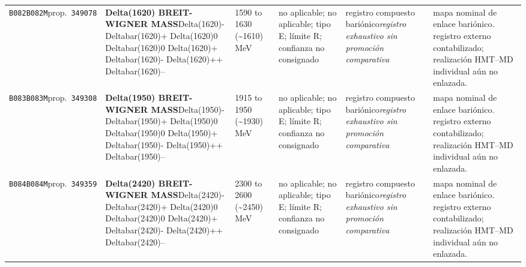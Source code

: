 \begin{landscape}
\begin{longtable}{L{1.85cm}L{4.45cm}L{2.35cm}L{4.05cm}L{3.35cm}L{7.15cm}}
\texttt{B082}\newline \texttt{B082M}\newline prop.\ \texttt{349078} & \textbf{Delta(1620) BREIT-WIGNER MASS}\newline Delta(1620)- \textbar{}\allowbreak{} Deltabar(1620)+ \textbar{}\allowbreak{} Delta(1620)0 \textbar{}\allowbreak{} Deltabar(1620)0 \textbar{}\allowbreak{} Delta(1620)+ \textbar{}\allowbreak{} Deltabar(1620)- \textbar{}\allowbreak{} Delta(1620)++ \textbar{}\allowbreak{} Deltabar(1620)-- & 1590 to 1630 (\textasciitilde{}1610)\,MeV & no aplicable; no aplicable; tipo E; límite R; confianza no consignado & registro compuesto bariónico\newline \emph{registro exhaustivo sin promoción comparativa} & mapa nominal de enlace bariónico. registro externo contabilizado; realización HMT--MD individual aún no enlazada. \\
\texttt{B083}\newline \texttt{B083M}\newline prop.\ \texttt{349308} & \textbf{Delta(1950) BREIT-WIGNER MASS}\newline Delta(1950)- \textbar{}\allowbreak{} Deltabar(1950)+ \textbar{}\allowbreak{} Delta(1950)0 \textbar{}\allowbreak{} Deltabar(1950)0 \textbar{}\allowbreak{} Delta(1950)+ \textbar{}\allowbreak{} Deltabar(1950)- \textbar{}\allowbreak{} Delta(1950)++ \textbar{}\allowbreak{} Deltabar(1950)-- & 1915 to 1950 (\textasciitilde{}1930)\,MeV & no aplicable; no aplicable; tipo E; límite R; confianza no consignado & registro compuesto bariónico\newline \emph{registro exhaustivo sin promoción comparativa} & mapa nominal de enlace bariónico. registro externo contabilizado; realización HMT--MD individual aún no enlazada. \\
\texttt{B084}\newline \texttt{B084M}\newline prop.\ \texttt{349359} & \textbf{Delta(2420) BREIT-WIGNER MASS}\newline Delta(2420)- \textbar{}\allowbreak{} Deltabar(2420)+ \textbar{}\allowbreak{} Delta(2420)0 \textbar{}\allowbreak{} Deltabar(2420)0 \textbar{}\allowbreak{} Delta(2420)+ \textbar{}\allowbreak{} Deltabar(2420)- \textbar{}\allowbreak{} Delta(2420)++ \textbar{}\allowbreak{} Deltabar(2420)-- & 2300 to 2600 (\textasciitilde{}2450)\,MeV & no aplicable; no aplicable; tipo E; límite R; confianza no consignado & registro compuesto bariónico\newline \emph{registro exhaustivo sin promoción comparativa} & mapa nominal de enlace bariónico. registro externo contabilizado; realización HMT--MD individual aún no enlazada. \\

\end{longtable}
\end{landscape}
